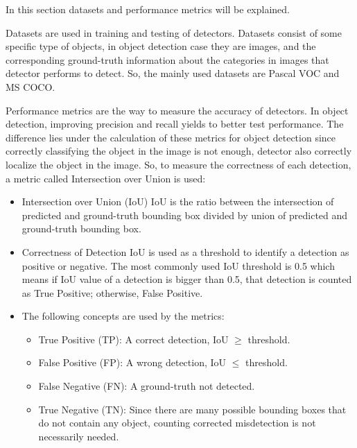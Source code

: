\documentclass{article}
\begin{document}
\setlength{\parindent}{6ex}

\indent

In this section datasets and performance metrics will be explained. \par 
Datasets are used in training and testing of detectors. Datasets consist of some 
specific type of objects, in object detection case they are images, and the 
corresponding ground-truth information about the categories in images that 
detector performs to detect. So, the mainly used datasets are Pascal VOC and 
MS COCO. \par

Performance metrics are the way to measure the accuracy of detectors. In object 
detection, improving precision and recall yields to better test performance. The 
difference lies under the calculation of these metrics for object detection since 
correctly classifying the object in the image is not enough, detector also correctly 
localize the object in the image. So, to measure the correctness of each detection, 
a metric called Intersection over Union is used:
\begin{itemize}
    \item Intersection over Union (IoU)
    IoU is the ratio between the intersection of predicted and ground-truth bounding box 
    divided by union of predicted and ground-truth bounding box. 
    \item Correctness of Detection
    IoU is used as a threshold to identify a detection as positive or negative. The 
    most commonly used IoU threshold is 0.5 which means if IoU value of a detection is 
    bigger than 0.5, that detection is counted as True Positive; otherwise, False Positive.
    \item The following concepts are used by the metrics:
    \begin{itemize}
        \item True Positive (TP): A correct detection, IoU $\geq$ threshold. 
        \item False Positive (FP): A wrong detection, IoU $\leq$ threshold.
        \item False Negative (FN): A ground-truth not detected.
        \item True Negative (TN): Since there are many possible bounding boxes that 
        do not contain any object, counting corrected misdetection is not necessarily 
        needed.
    \end{itemize}
    
\end{itemize}
\end{document}
